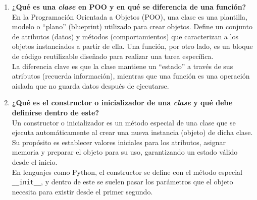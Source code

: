 \documentclass[12pt, a4paper]{article}
\begin{document}
\begin{enumerate}
    \item \textbf{¿Qué es una \textit{clase} en POO y en qué se diferencia de una función?} \\
    En la Programación Orientada a Objetos (POO), una clase es una plantilla, modelo o ``plano'' (blueprint) utilizado para crear objetos. Define un conjunto de atributos (datos) y métodos (comportamientos) que caracterizan a los objetos instanciados a partir de ella. Una función, por otro lado, es un bloque de código reutilizable diseñado para realizar una tarea específica.\\
    La diferencia clave es que la clase mantiene un ``estado'' a través de sus atributos (recuerda información), mientras que una función es una operación aislada que no guarda datos después de ejecutarse.

    \item \textbf{¿Qué es el constructor o inicializador de una \textit{clase} y qué debe definirse dentro de este?} \\
    Un constructor o inicializador es un método especial de una clase que se ejecuta automáticamente al crear una nueva instancia (objeto) de dicha clase. Su propósito es establecer valores iniciales para los atributos, asignar memoria y preparar el objeto para su uso, garantizando un estado válido desde el inicio. \\
    En lenguajes como Python, el constructor se define con el método especial \texttt{\_\_init\_\_}, y dentro de este se suelen pasar los parámetros que el objeto necesita para existir desde el primer segundo.

\end{enumerate}
\end{document}
